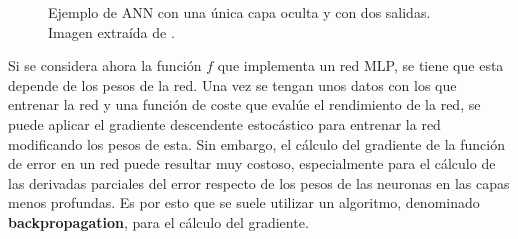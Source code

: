 \begin{figure}[h]
\noindent
{}
\caption{ Ejemplo de ANN con una única capa oculta y con dos salidas. Imagen extraída de \cite{Haykin}.}
\label{fig:red_neuronal_ff}
\end{figure}

Si se considera ahora la función $f$ que implementa un red MLP, se tiene que esta depende de los pesos de la red. Una vez se tengan unos datos con los que entrenar la red y una función de coste que evalúe el rendimiento de la red, se puede aplicar el gradiente descendente estocástico para entrenar la red modificando los pesos de esta. Sin embargo, el cálculo del gradiente de la función de error en un red puede resultar muy costoso, especialmente para el cálculo de las derivadas parciales del error respecto de los pesos de las neuronas en las capas menos profundas. Es por esto que se suele utilizar un algoritmo, denominado \textbf{backpropagation}, para el cálculo del gradiente. 

